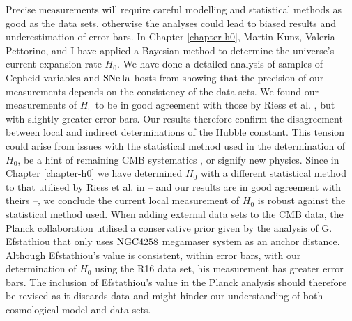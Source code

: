 Precise measurements will require careful modelling and statistical methods as good as the data sets, otherwise the analyses could lead to biased results and underestimation of error bars. In Chapter \ref{chapter-h0}, Martin Kunz, Valeria Pettorino, and I have applied a Bayesian method to determine the universe's current expansion rate $H_0$. We have done a detailed analysis of samples of Cepheid variables and $\mathrm{SNe\,Ia}$ hosts from \cite{Riess:2011yx,Riess:2016jrr} showing that the precision of our measurements depends on the consistency of the data sets. We found our measurements of $H_0$ to be in good agreement with those by Riess et al. \cite{Riess:2011yx,Riess:2016jrr}, but with slightly greater error bars. Our results therefore confirm the disagreement between local and indirect determinations of the Hubble constant. This tension could arise from issues with the statistical method used in the determination of $H_0$, be a hint of remaining CMB systematics \cite{Riess:2016jrr}, or signify new physics. Since in Chapter \ref{chapter-h0} we have determined $H_0$ with a different statistical method to that utilised by Riess et al. in \cite{Riess:2016jrr} -- and our results are in good agreement with theirs --, we conclude the current local measurement of $H_0$ is robust against the statistical method used. When adding external data sets to the CMB data, the Planck collaboration utilised a conservative prior given by the analysis of G. Efstathiou \cite{Efstathiou:2013via} that only uses $\mathrm{NGC4258}$ megamaser system as an anchor distance. Although Efstathiou's value is consistent, within error bars, with our determination of $H_0$ using the R16 data set, his measurement has greater error bars. The inclusion of Efstathiou's value in the Planck analysis should therefore be revised as it discards data and might hinder our understanding of both cosmological model and data sets.        

